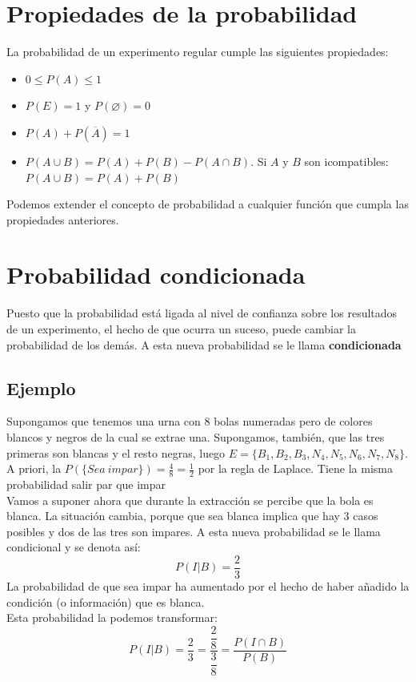 \documentclass[a4paper,spanish,9pt]{extarticle}
\begin{document}
\begin{multicols*}{2}
\section{Propiedades de la probabilidad} La probabilidad de un experimento regular cumple las siguientes propiedades:
\begin{itemize}
\item $0 \leq P(A) \leq 1$ 
\item $P(E) = 1$ y $P(\varnothing) = 0$
\item $P(A) + P(\overline A) = 1$
\item $P(A \cup B) = P(A) + P(B) - P(A \cap B)$. Si $A$ y $B$ son icompatibles: $P(A \cup B) = P(A) + P(B)$
\end{itemize}
Podemos extender el concepto de probabilidad a cualquier función que cumpla las propiedades anteriores.  

\section{Probabilidad condicionada}

Puesto que la probabilidad está ligada al nivel de confianza sobre los resultados de un experimento, el hecho de que ocurra un suceso, puede cambiar la probabilidad de los demás. A esta nueva probabilidad se le llama \textbf{condicionada}
\subsection{Ejemplo}
 Supongamos que tenemos una urna con 8 bolas numeradas pero de colores blancos y negros de la cual se extrae una. Supongamos, también, que las tres primeras son blancas y el resto negras, luego  $E=\lbrace B_1,B_2, B_3, N_4, N_5, N_6, N_7, N_8\rbrace$.\\
 A priori, la $P(\lbrace Sea\ impar\rbrace )=\frac{4}{8}=\frac{1}{2}$ por la regla de Laplace. Tiene la misma probabilidad salir par que impar\\
 Vamos a suponer ahora que durante la extracción se percibe que la bola es blanca. La situación cambia, porque que sea blanca implica que hay 3 casos posibles y dos de las tres son impares. A esta nueva probabilidad se le llama  condicional y se denota así:
 $$P(I|B)=\dfrac{2}{3}$$
La probabilidad de que sea impar ha aumentado por el hecho de haber añadido la condición (o información) que es blanca.\\
Esta probabilidad la podemos transformar:
 $$P(I|B)=\dfrac{2}{3}=\dfrac{\dfrac{2}{8}}{\dfrac{3}{8}}=\dfrac{P(I\cap B)}{P(B)}$$


\end{multicols*}
\end{document}

